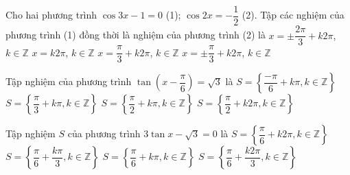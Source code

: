 \begin{ex}%
	Cho hai phương trình $\cos 3x-1=0$ (1); $\cos  2x=-\dfrac{1}{2}$ (2). Tập các nghiệm của phương trình (1) đồng thời là nghiệm của phương trình (2) là
	 \choice
		{\True $x=\pm \dfrac{2\pi}{3}+k2\pi $,  $k\in \mathbb{Z}$}
		{$x=k2\pi $,  $k\in \mathbb{Z}$}
		{$x=\dfrac{\pi}{3}+k2\pi  $, $k\in \mathbb{Z}$}
		{$x=\pm \dfrac{\pi}{3}+k2\pi $, $k\in  \mathbb{Z}$}
\end{ex}

\begin{ex}%
	Tập nghiệm của phương  trình $\tan \left(x-\dfrac{\pi }{6}\right)=\sqrt{3}$ là
	 \choice
		{  $S=\left\{\dfrac{-\pi }{6}+k\pi,k\in \mathbb{Z}\right\}$}
		{ $S=\left\{\dfrac{\pi }{3}+k\pi,k\in  \mathbb{Z}\right\}$}
		{\True $S=\left\{\dfrac{\pi }{2}+k\pi,k\in \mathbb{Z}\right\}$} 
		{ $S=\left\{\dfrac{\pi }{2}+k2\pi,k\in  \mathbb{Z}\right\}$}
\end{ex}

\begin{ex}%
	Tập nghiệm $S$ của phương  trình $3\tan x-\sqrt{3}=0$ là
	\choice 
		{$S=\left\{\dfrac{\pi}{6}+k2\pi,k\in  \mathbb{Z}\right\}$}
		 {$S=\left\{\dfrac{\pi}{6}+\dfrac{k\pi}{3},k\in \mathbb{Z}\right\}$}
		{\True $S=\left\{\dfrac{\pi}{6}+k\pi,k\in  \mathbb{Z}\right\}$}
		{$S=\left\{\dfrac{\pi}{6}+\dfrac{k2\pi}{3},k\in \mathbb{Z}\right\}$} 
\end{ex}

